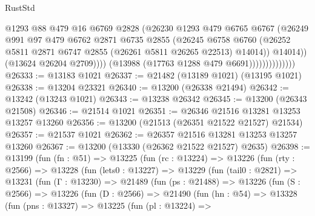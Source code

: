 \begin{lexlean}{RustStd}
\begin{coremodule}
                                  @1293
                                  @88
                                  @479
                                  @16
                                  @6769
                                  @2828
                                  (@26230
                                    @1293
                                    @479
                                    @6765
                                    @6767
                                    (@26249
                                      @991
                                      @97
                                      @479
                                      @6762
                                      @2871
                                      @6735
                                      @2855
                                      (@26245
                                        @6758
                                        @6760
                                        (@26252
                                          @5811
                                          @2871
                                          @6747
                                          @2855
                                          (@26261 @5811 @26265 @22513)
                                          @14014))
                                      @14014))
                                  (@13624 @26204 @2709))))
                            (@13988 (@17763 @1288 @479 @6691))))))))))))))
@26333 := @13183 @1021
@26337 := @21482 (@13189 @1021) (@13195 @1021)
@26338 := @13204 @23321
@26340 := @13200 (@26338 @21494)
@26342 := @13242 (@13243 @1021)
@26343 := @13238 @26342
@26345 := @13200 (@26343 @21508)
@26346 := @21514 @1021
@26351 := @26346 @21516 @13281 @13253 @13257 @13260
@26356 := @13200 (@21513 (@26351 @21522 @21527) @21534)
@26357 := @21537 @1021
@26362 := @26357 @21516 @13281 @13253 @13257 @13260
@26367 := @13200 (@13330 (@26362 @21522 @21527) @2635)
@26398 := @13199
    (fun (fn : @51) =>
    @13225
      (fun (rc : @13224) =>
      @13226
        (fun (rty : @2566) =>
        @13228
          (fun (lets0 : @13227) =>
          @13229
            (fun (tail0 : @2821) =>
            @13231
              (fun (Γ : @13230) =>
              @21489
                (fun (ps : @21488) =>
                @13226
                  (fun (S : @2566) =>
                  @13226
                    (fun (D : @2566) =>
                    @21490
                      (fun (hn : @54) =>
                      @13328
                        (fun (pns : @13327) =>
                        @13225
                          (fun (pl : @13224) =>

\end{coremodule}
\end{lexlean}
